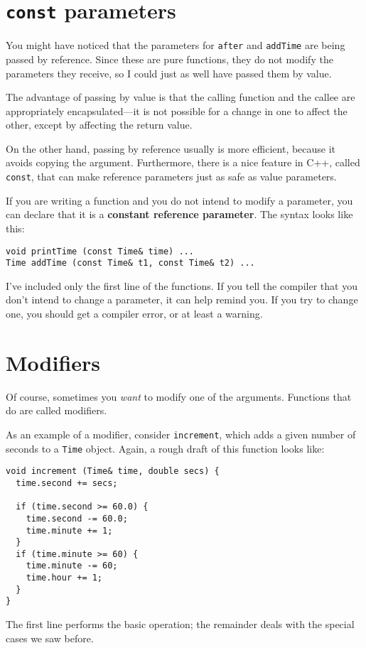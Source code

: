 \section{{\tt const} parameters}

You might have noticed that the parameters for {\tt after}
and {\tt addTime} are being passed by reference.  Since
these are pure functions, they do not modify the parameters
they receive, so I could just as well have passed them by
value.

The advantage of passing by value is that the calling function
and the callee are appropriately encapsulated---it is not possible
for a change in one to affect the other, except by affecting
the return value.

On the other hand, passing by reference usually is more efficient,
because it avoids copying the argument.  Furthermore, there is a nice
feature in C++, called {\tt const}, that can make reference parameters
just as safe as value parameters.

If you are writing a function and you do not intend to modify
a parameter, you can declare that it is a {\bf constant
reference parameter}.  The syntax looks like this:

\begin{verbatim}
void printTime (const Time& time) ...
Time addTime (const Time& t1, const Time& t2) ...
\end{verbatim}
%
I've included only the first line of the functions.  If you tell
the compiler that you don't intend to change a
parameter, it can help remind you.  If you try to change one,
you should get a compiler error, or at least a warning.


\section{Modifiers}

Of course, sometimes you {\em want} to modify one of the
arguments.  Functions that do are called modifiers.

As an example of a modifier, consider {\tt increment},
which adds a given number of seconds to a {\tt Time} object.
Again, a rough draft of this function looks like:

\begin{verbatim}
void increment (Time& time, double secs) {
  time.second += secs;

  if (time.second >= 60.0) {
    time.second -= 60.0;
    time.minute += 1;
  }
  if (time.minute >= 60) {
    time.minute -= 60;
    time.hour += 1;
  }
}
\end{verbatim}
%
The first line performs the basic operation; the remainder
deals with the special cases we saw before.

